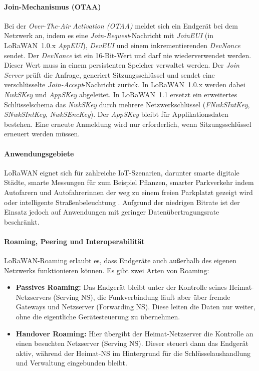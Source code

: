 \paragraph*{Join-Mechanismus (OTAA)}
\label{sec:joinmechanissmus_otaa}
Bei der \emph{Over-The-Air Activation (OTAA)} meldet sich ein Endgerät bei dem Netzwerk an, indem es eine \emph{Join-Request}-Nachricht mit \emph{JoinEUI} (in LoRaWAN~1.0.x \emph{AppEUI}), \emph{DevEUI} und einem inkrementierenden \emph{DevNonce} sendet. Der \emph{DevNonce} ist ein 16-Bit-Wert und darf nie wiederverwendet werden. Dieser Wert muss in einem persistenten Speicher verwaltet werden. Der \emph{Join Server} prüft die Anfrage, generiert Sitzungsschlüssel und sendet eine verschlüsselte \emph{Join-Accept}-Nachricht zurück. In LoRaWAN~1.0.x werden dabei \emph{NwkSKey} und \emph{AppSKey} abgeleitet. In LoRaWAN~1.1 ersetzt ein erweitertes Schlüsselschema das \emph{NwkSKey} durch mehrere Netzwerkschlüssel (\emph{FNwkSIntKey}, \emph{SNwkSIntKey}, \emph{NwkSEncKey}). Der \emph{AppSKey} bleibt für Applikationsdaten bestehen. Eine erneute Anmeldung wird nur erforderlich, wenn Sitzungsschlüssel erneuert werden müssen. \autocite{thethingsnetworkJoin,techplayonJoin}

\paragraph*{Anwendungsgebiete}
LoRaWAN eignet sich für zahlreiche IoT-Szenarien, darunter smarte digitale Städte, smarte Messungen für zum Beispiel Pflanzen, smarter Parkverkehr indem Autofarern und Autofahrerinnen der weg zu einem freien Parkplatzt gezeigt wird oder intelligente Straßenbeleuchtung \autocite{BadenWuerttembergFoerdertLong2024}. Aufgrund der niedrigen Bitrate ist der Einsatz jedoch auf Anwendungen mit geringer Datenübertragungsrate beschränkt.

\paragraph*{Roaming, Peering und Interoperabilität}
LoRaWAN-Roaming erlaubt es, dass Endgeräte auch außerhalb des eigenen Netzwerks funktionieren können. Es gibt zwei Arten von Roaming:

\begin{itemize}
  \item \textbf{Passives Roaming:} Das Endgerät bleibt unter der Kontrolle seines Heimat-Netzservers (Serving NS), die Funkverbindung läuft aber über fremde Gateways und Netzserver (Forwarding NS). Diese leiten die Daten nur weiter, ohne die eigentliche Gerätesteuerung zu übernehmen.
  \item \textbf{Handover Roaming:} Hier übergibt der Heimat-Netzserver die Kontrolle an einen besuchten Netzserver (Serving NS). Dieser steuert dann das Endgerät aktiv, während der Heimat-NS im Hintergrund für die Schlüsselaushandlung und Verwaltung eingebunden bleibt.
\end{itemize}

